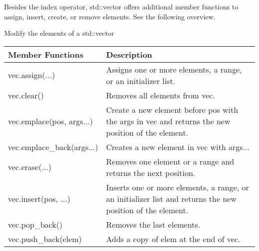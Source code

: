 Besides the index operator, std::vector offers additional member functions to assign, insert, create, or remove elements. See the following overview.

\begin{center}
Modify the elements of a std::vector
\end{center}

\begin{longtable}[c]{|l|l|}
\hline
\textbf{Member Functions}  & \textbf{Description}                                           \\ \hline
\endfirsthead
%
\endhead
%
vec.assign(...)            & Assigns one or more elements, a range, or an initializer list. \\ \hline
vec.clear()                & Removes all elements from vec.                                 \\ \hline
vec.emplace(pos, args...) & Create a new element before pos with the args in vec and returns the new position of the element.          \\ \hline
vec.emplace\_back(args...) & Creates a new element in vec with args...                      \\ \hline
vec.erase(...)             & Removes one element or a range and returns the next position.  \\ \hline
vec.insert(pos, ...)      & Inserts one or more elements, a range, or an initializer list and returns the new position of the element. \\ \hline
vec.pop\_back()            & Removes the last elements.                                     \\ \hline
vec.push\_back(elem)       & Adds a copy of elem at the end of vec.                         \\ \hline
\end{longtable}
























